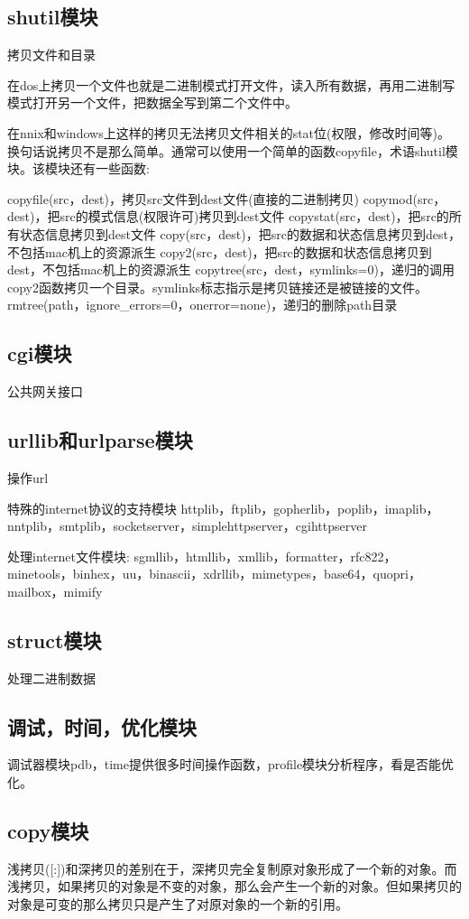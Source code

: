 \documentclass[twoside,11pt]{book}
\begin{document}
\subsection{shutil模块}
拷贝文件和目录

在dos上拷贝一个文件也就是二进制模式打开文件，读入所有数据，再用二进制写模式打开另一个文件，把数据全写到第二个文件中。

在nnix和windows上这样的拷贝无法拷贝文件相关的stat位(权限，修改时间等)。换句话说拷贝不是那么简单。通常可以使用一个简单的函数copyfile，术语shutil模块。该模块还有一些函数:

copyfile(src，dest)，拷贝src文件到dest文件(直接的二进制拷贝)
copymod(src，dest)，把src的模式信息(权限许可)拷贝到dest文件
copystat(src，dest)，把src的所有状态信息拷贝到dest文件
copy(src，dest)，把src的数据和状态信息拷贝到dest，不包括mac机上的资源派生
copy2(src，dest)，把src的数据和状态信息拷贝到dest，不包括mac机上的资源派生
copytree(src，dest，symlinks=0)，递归的调用copy2函数拷贝一个目录。symlinks标志指示是拷贝链接还是被链接的文件。
rmtree(path，ignore\_errors=0，onerror=none)，递归的删除path目录


\subsection{cgi模块}
公共网关接口

\subsection{urllib和urlparse模块}
操作url

特殊的internet协议的支持模块
httplib，ftplib，gopherlib，poplib，imaplib，nntplib，smtplib，socketserver，simplehttpserver，cgihttpserver

处理internet文件模块:
sgmllib，htmllib，xmllib，formatter，rfc822，minetools，binhex，uu，binascii，xdrllib，mimetypes，base64，quopri，mailbox，mimify

\subsection{struct模块}
处理二进制数据

\subsection{调试，时间，优化模块}
调试器模块pdb，time提供很多时间操作函数，profile模块分析程序，看是否能优化。

\subsection{copy模块}
浅拷贝([:])和深拷贝的差别在于，深拷贝完全复制原对象形成了一个新的对象。而浅拷贝，如果拷贝的对象是不变的对象，那么会产生一个新的对象。但如果拷贝的对象是可变的那么拷贝只是产生了对原对象的一个新的引用。
\end{document}
